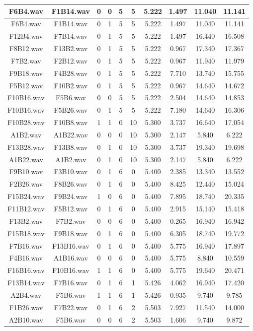 \documentclass[11pt,a4paper]{book}
\begin{document}
\begin{longtable}[c]{|c|c|c|c|c|c|c|c|c|c|}
F6B4.wav&F1B14.wav&0&0&5&5&5.222&1.497&11.040&11.141\\ \hline
F6B4.wav&F1B14.wav&0&1&5&5&5.222&1.497&11.040&11.141\\ \hline
F12B4.wav&F7B14.wav&0&1&5&5&5.222&1.497&16.440&16.508\\ \hline
F8B12.wav&F13B2.wav&0&1&5&5&5.222&0.967&17.340&17.367\\ \hline
F7B2.wav&F2B12.wav&0&1&5&5&5.222&0.967&11.940&11.979\\ \hline
F9B18.wav&F4B28.wav&0&1&5&5&5.222&7.710&13.740&15.755\\ \hline
F5B12.wav&F10B2.wav&0&1&5&5&5.222&0.967&14.640&14.672\\ \hline
F10B16.wav&F5B6.wav&0&0&5&5&5.222&2.504&14.640&14.853\\ \hline
F10B16.wav&F5B26.wav&0&1&5&5&5.222&7.180&14.640&16.306\\ \hline
F10B28.wav&F10B8.wav&1&1&0&10&5.300&3.737&16.640&17.054\\ \hline
A1B2.wav&A1B22.wav&0&0&0&10&5.300&2.147&5.840&6.222\\ \hline
F13B28.wav&F13B8.wav&0&1&0&10&5.300&3.737&19.340&19.698\\ \hline
A1B22.wav&A1B2.wav&0&1&0&10&5.300&2.147&5.840&6.222\\ \hline
F9B10.wav&F3B10.wav&0&1&6&0&5.400&2.385&13.340&13.552\\ \hline
F2B26.wav&F8B26.wav&0&1&6&0&5.400&8.425&12.440&15.024\\ \hline
F15B24.wav&F9B24.wav&1&0&6&0&5.400&7.895&18.740&20.335\\ \hline
F11B12.wav&F5B12.wav&0&1&6&0&5.400&2.915&15.140&15.418\\ \hline
F13B2.wav&F7B2.wav&0&0&6&0&5.400&0.265&16.940&16.942\\ \hline
F15B18.wav&F9B18.wav&0&1&6&0&5.400&6.305&18.740&19.772\\ \hline
F7B16.wav&F13B16.wav&0&1&6&0&5.400&5.775&16.940&17.897\\ \hline
F4B16.wav&A1B16.wav&0&0&6&0&5.400&5.775&8.840&10.559\\ \hline
F16B16.wav&F10B16.wav&1&1&6&0&5.400&5.775&19.640&20.471\\ \hline
F13B14.wav&F7B16.wav&0&1&6&1&5.426&4.062&16.940&17.420\\ \hline
A2B4.wav&F5B6.wav&1&1&6&1&5.426&0.935&9.740&9.785\\ \hline
F1B26.wav&F7B22.wav&0&1&6&2&5.503&7.927&11.540&14.000\\ \hline
A2B10.wav&F5B6.wav&0&0&6&2&5.503&1.606&9.740&9.872\\ \hline

\end{longtable}
\end{document}
